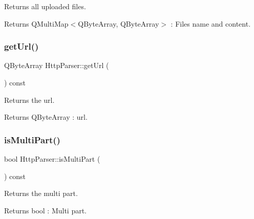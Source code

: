 Returns all uploaded files. 

\begin{DoxyReturn}{Returns}
Q\+Multi\+Map$<$\+Q\+Byte\+Array, Q\+Byte\+Array$>$ \+: Files name and content. 
\end{DoxyReturn}
\mbox{\label{class_http_parser_a7a1db20efbebf30e1f16004a35ab665f}} 
\subsubsection{\texorpdfstring{get\+Url()}{getUrl()}}
{\footnotesize\ttfamily Q\+Byte\+Array Http\+Parser\+::get\+Url (\begin{DoxyParamCaption}{ }\end{DoxyParamCaption}) const\hspace{0.3cm}{\ttfamily [inline]}}



Returns the url. 

\begin{DoxyReturn}{Returns}
Q\+Byte\+Array \+: url. 
\end{DoxyReturn}
\mbox{\label{class_http_parser_acbb3148607d2a3c80ba4e74573165f1d}} 
\subsubsection{\texorpdfstring{is\+Multi\+Part()}{isMultiPart()}}
{\footnotesize\ttfamily bool Http\+Parser\+::is\+Multi\+Part (\begin{DoxyParamCaption}{ }\end{DoxyParamCaption}) const\hspace{0.3cm}{\ttfamily [inline]}}



Returns the multi part. 

\begin{DoxyReturn}{Returns}
bool \+: Multi part. 
\end{DoxyReturn}
\mbox{\label{class_http_parser_a75e0872ac2323b7bd583ea5547503a50}} 
